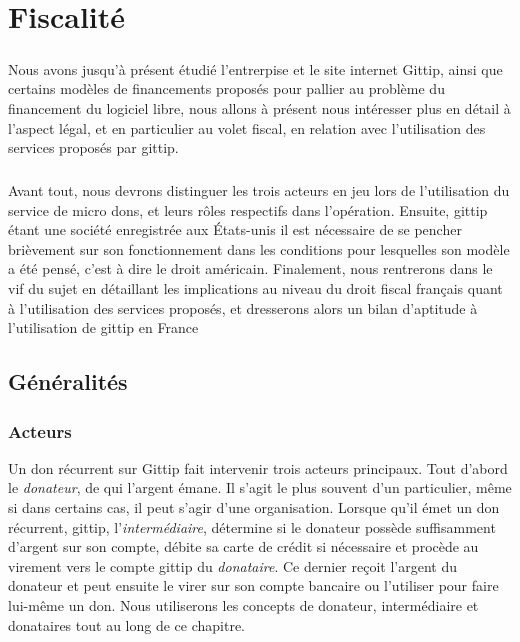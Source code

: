 \chapter{Fiscalité}\label{chapter3}
        \paragraph{}
            Nous avons jusqu'à présent étudié l'entrerpise et le site
            internet Gittip, ainsi que certains modèles de financements
            proposés pour pallier au problème du financement du logiciel
            libre, nous allons à présent nous intéresser plus en détail
            à l'aspect légal, et en particulier au volet fiscal, en relation
            avec l'utilisation des services proposés par gittip.
        \paragraph{}
            Avant tout, nous devrons distinguer les trois acteurs en jeu
            lors de l'utilisation du service de micro dons, et leurs rôles
            respectifs dans l'opération.
            Ensuite, gittip étant une société enregistrée aux États-unis
            il est nécessaire de se pencher brièvement sur son fonctionnement
            dans les conditions pour lesquelles son modèle a été pensé,
            c'est à dire le droit américain.
            Finalement, nous rentrerons dans le vif du sujet en détaillant les
            implications au niveau du droit fiscal français quant à
            l'utilisation des services proposés, et dresserons alors un bilan
            d'aptitude à l'utilisation de gittip en France

    \section{Généralités}
        \subsection{Acteurs}
            Un don récurrent sur Gittip fait intervenir trois acteurs
            principaux.
            Tout d'abord le \emph{donateur}, de qui l'argent émane.
            Il s'agit le plus souvent d'un particulier, même si dans
            certains cas, il peut s'agir d'une organisation.
            Lorsque qu'il émet un don récurrent, gittip,
            l'\emph{intermédiaire}, détermine si
            le donateur possède suffisamment d'argent sur son compte,
            débite sa carte de crédit si nécessaire et procède au
            virement vers le compte gittip du \emph{donataire}. Ce dernier
            reçoit l'argent du donateur et peut ensuite le virer sur son
            compte bancaire ou l'utiliser pour faire lui-même un don.
            Nous utiliserons les concepts de donateur, intermédiaire et
            donataires tout au long de ce chapitre.
